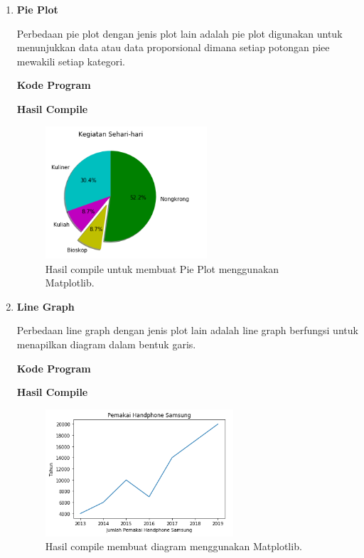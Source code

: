 \begin{enumerate}
	\item \textbf{Pie Plot}
	
	Perbedaan pie plot dengan jenis plot lain adalah pie plot digunakan untuk menunjukkan data atau data proporsional dimana setiap potongan piee mewakili setiap kategori.
	
	\textbf{Kode Program}
	
	
	
	\textbf{Hasil Compile}
	
	\begin{figure}[H]
		\includegraphics[width=6cm]{figures/6/1144124/pie.png}
		\centering
		\caption{Hasil compile untuk membuat Pie Plot menggunakan Matplotlib.}
	\end{figure}
	
	\item \textbf{Line Graph}
	
	Perbedaan line graph dengan jenis plot lain adalah line graph berfungsi untuk menapilkan diagram dalam bentuk garis.
	
	\textbf{Kode Program}
	
	
	
	\textbf{Hasil Compile}
	
	\begin{figure}[H]
		\includegraphics[width=7cm]{figures/6/1144124/line.png}
		\centering
		\caption{Hasil compile membuat diagram menggunakan Matplotlib.}
	\end{figure}
	
\end{enumerate}

